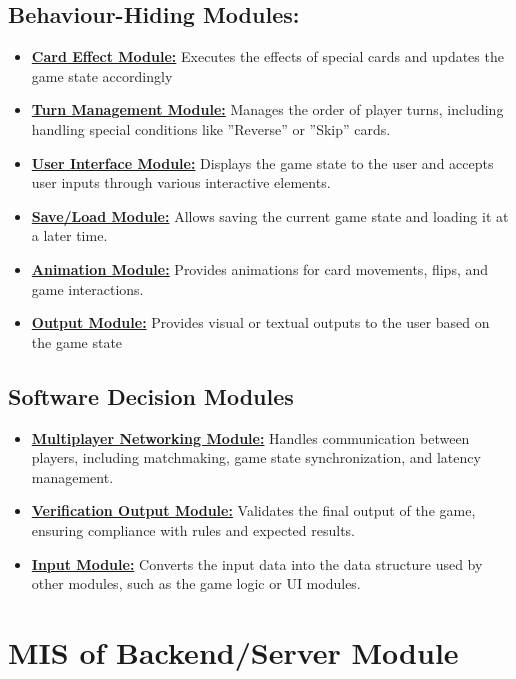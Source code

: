 \documentclass[12pt, titlepage]{article}
\begin{document}
\subsection{Behaviour-Hiding Modules:} 

\begin{itemize}
\item \hyperref[CEM]{\textbf{Card Effect Module:}} Executes the effects of special cards and updates the game state accordingly
\item \hyperref[TMM]{\textbf{Turn Management Module:}} Manages the order of player turns, including handling special conditions like ”Reverse” or ”Skip” cards.
\item \hyperref[UIM]{\textbf{User Interface Module:}} Displays the game state to the user and accepts user inputs through various interactive elements.
\item \hyperref[SLM]{\textbf{Save/Load Module:}} Allows saving the current game state and loading it at a later time.
\item \hyperref[AM]{\textbf{Animation Module:}} Provides animations for card movements, flips, and game interactions.
\item \hyperref[OM]{\textbf{Output Module:}} Provides visual or textual outputs to the user based on the game state
\end{itemize}

\subsection{Software Decision Modules}

\begin{itemize}
\item \hyperref[MNM]{\textbf{Multiplayer Networking Module:}} Handles communication between players, including matchmaking, game state synchronization, and latency management.
\item \hyperref[VOM]{\textbf{Verification Output Module:}} Validates the final output of the game, ensuring compliance with rules and expected results.
\item \hyperref[IM]{\textbf{Input Module:}} Converts the input data into the data structure used by other modules, such as the game logic or UI modules.
\end{itemize}


\section{MIS of Backend/Server Module} 
\label{BSM}
\end{document}
